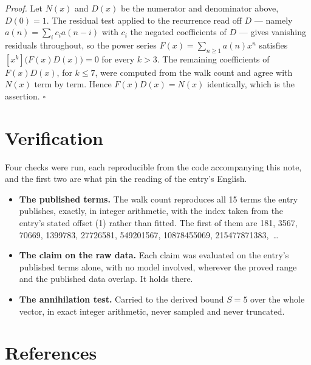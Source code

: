 \documentclass[11pt]{article}
\theoremstyle{definition}
\begin{document}
{\itshape Proof.} Let $N(x)$ and $D(x)$ be the numerator and denominator above, $D(0)=1$. The residual test applied to the recurrence read off $D$ --- namely $a(n) = \sum_i c_i a(n-i)$ with $c_i$ the negated coefficients of $D$ --- gives vanishing residuals throughout, so the power series $F(x)=\sum_{n\ge 1}a(n)x^n$ satisfies $[x^k]\bigl(F(x)D(x)\bigr) = 0$ for every $k > 3$. The remaining coefficients of $F(x)D(x)$, for $k \le 7$, were computed from the walk count and agree with $N(x)$ term by term. Hence $F(x)D(x) = N(x)$ identically, which is the assertion. $\square$

\section{Verification}

Four checks were run, each reproducible from the code accompanying this note, and the first two are what pin the reading of the entry's English.

\begin{itemize}

\item {\bfseries The published terms.} The walk count reproduces all 15 terms the entry publishes, exactly, in integer arithmetic, with the index taken from the entry's stated offset (1) rather than fitted. The first of them are 181, 3567, 70669, 1399783, 27726581, 549201567, 10878455069, 215477871383,~\dots

\item {\bfseries The claim on the raw data.} Each claim was evaluated on the entry's published terms alone, with no model involved, wherever the proved range and the published data overlap. It holds there.

\item {\bfseries The annihilation test.} Carried to the derived bound $S = 5$ over the whole vector, in exact integer arithmetic, never sampled and never truncated.

\end{itemize}

\section{References}
\end{document}

